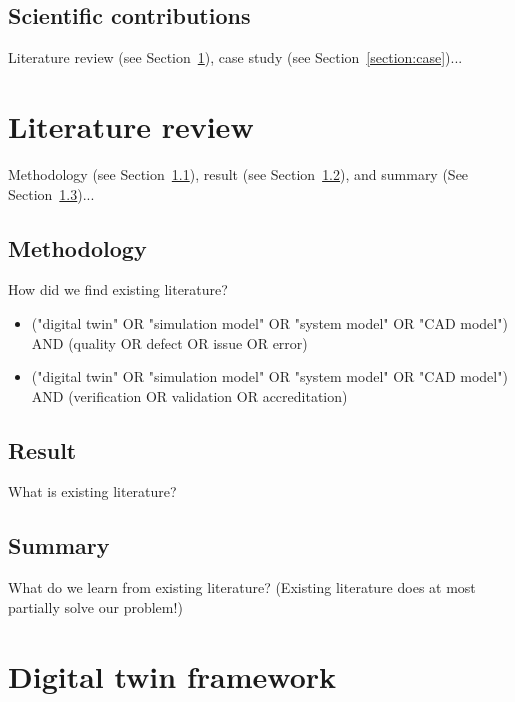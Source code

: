 \documentclass[conference]{IEEEtran}
\begin{document}
    \subsection{Scientific contributions}

    Literature review (see Section~\ref{section:literature}), case study (see Section~\ref{section:case})...
    
    \section{Literature review}
    \label{section:literature}

    Methodology (see Section~\ref{section:liteature_methodology}), result (see Section~\ref{section:liteature_result}), and summary (See Section~\ref{section:liteature_summary})...

    \subsection{Methodology}
    \label{section:liteature_methodology}

    How did we find existing literature?
    
    \begin{itemize}
        \item ("digital twin" OR "simulation model" OR "system model" OR "CAD model") AND (quality OR defect OR issue OR error)
        \item ("digital twin" OR "simulation model" OR "system model" OR "CAD model") AND (verification OR validation OR accreditation)
    \end{itemize}

    \subsection{Result}
    \label{section:liteature_result}

    What is existing literature?

    \subsection{Summary}
    \label{section:liteature_summary}

    What do we learn from existing literature?
    (Existing literature does at most partially solve our problem!)

    \section{Digital twin framework}
    \label{section:framework_1}
\end{document}
